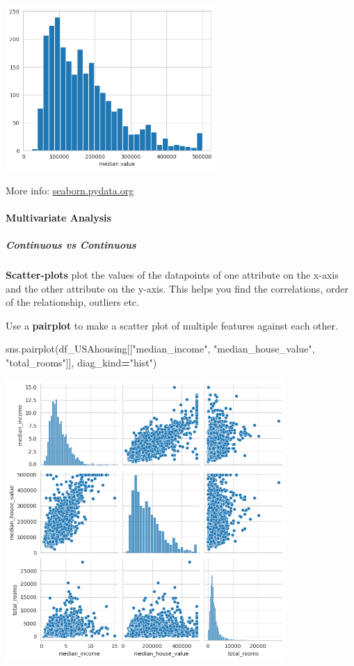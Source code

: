\documentclass[
]{book}
\newenvironment{Shaded}{\begin{snugshade}}{\end{snugshade}}
\newcommand{\NormalTok}[1]{#1}
\newcommand{\OperatorTok}[1]{\textcolor[rgb]{0.81,0.36,0.00}{\textbf{#1}}}
\newcommand{\StringTok}[1]{\textcolor[rgb]{0.31,0.60,0.02}{#1}}
\begin{document}
\includegraphics[width=0.6\textwidth,height=\textheight]{figures/hist_med_house_value.png}

More info:
\href{https://seaborn.pydata.org/tutorial/distributions.html}{seaborn.pydata.org}

\hypertarget{multivariate-analysis}{%
\paragraph{Multivariate Analysis}\label{multivariate-analysis}}

\hypertarget{continuous-vs-continuous}{%
\subparagraph{Continuous vs Continuous}\label{continuous-vs-continuous}}

\textbf{Scatter-plots} plot the values of the datapoints of one attribute on
the x-axis and the other attribute on the y-axis. This helps you find
the correlations, order of the relationship, outliers etc.

Use a \textbf{pairplot} to make a scatter plot of multiple features against
each other.

\begin{Shaded}
\begin{Highlighting}[]
\NormalTok{sns.pairplot(df\_USAhousing[[}\StringTok{"median\_income"}\NormalTok{, }\StringTok{"median\_house\_value"}\NormalTok{, }\StringTok{"total\_rooms"}\NormalTok{]], diag\_kind}\OperatorTok{=}\StringTok{"hist"}\NormalTok{)}
\end{Highlighting}
\end{Shaded}

\includegraphics[width=0.8\textwidth,height=\textheight]{figures/pairplot_usa_housing.png}
\end{document}
